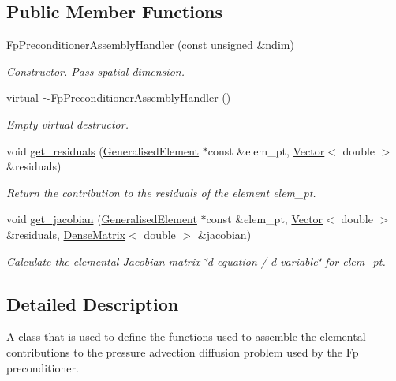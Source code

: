 \subsection*{Public Member Functions}
\begin{DoxyCompactItemize}
\item 
\hyperlink{classoomph_1_1FpPreconditionerAssemblyHandler_a7eaaf83208b73afdd805f4e8c816827f}{Fp\+Preconditioner\+Assembly\+Handler} (const unsigned \&ndim)
\begin{DoxyCompactList}\small\item\em Constructor. Pass spatial dimension. \end{DoxyCompactList}\item 
virtual \hyperlink{classoomph_1_1FpPreconditionerAssemblyHandler_a2945d993d1b45c02eb7af8ae752bff05}{$\sim$\+Fp\+Preconditioner\+Assembly\+Handler} ()
\begin{DoxyCompactList}\small\item\em Empty virtual destructor. \end{DoxyCompactList}\item 
void \hyperlink{classoomph_1_1FpPreconditionerAssemblyHandler_adfebe7f48f6fc715c258e1733218b12b}{get\+\_\+residuals} (\hyperlink{classoomph_1_1GeneralisedElement}{Generalised\+Element} $\ast$const \&elem\+\_\+pt, \hyperlink{classoomph_1_1Vector}{Vector}$<$ double $>$ \&residuals)
\begin{DoxyCompactList}\small\item\em Return the contribution to the residuals of the element elem\+\_\+pt. \end{DoxyCompactList}\item 
void \hyperlink{classoomph_1_1FpPreconditionerAssemblyHandler_a6360dd27d3530576487cb7e239dfe17e}{get\+\_\+jacobian} (\hyperlink{classoomph_1_1GeneralisedElement}{Generalised\+Element} $\ast$const \&elem\+\_\+pt, \hyperlink{classoomph_1_1Vector}{Vector}$<$ double $>$ \&residuals, \hyperlink{classoomph_1_1DenseMatrix}{Dense\+Matrix}$<$ double $>$ \&jacobian)
\begin{DoxyCompactList}\small\item\em Calculate the elemental Jacobian matrix \char`\"{}d equation 
/ d variable\char`\"{} for elem\+\_\+pt. \end{DoxyCompactList}\end{DoxyCompactItemize}


\subsection{Detailed Description}
A class that is used to define the functions used to assemble the elemental contributions to the pressure advection diffusion problem used by the Fp preconditioner. 

